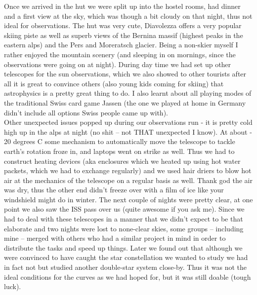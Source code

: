  Once we arrived in the hut we were split up into the hostel rooms, had dinner and a first view at the sky, which was though a bit cloudy on that night, thus not ideal for observations. The hut was very cute, Diavolezza offers a very popular skiing piste as well as superb views of the Bernina massif (highest peaks in the eastern alps) and the Pers and Moreratsch glacier. Being a non-skier myself I rather enjoyed the mountain scenery (and sleeping in on mornings, since the observations were going on at night). During day time we had set up other telescopes for the sun observations, which we also showed to other tourists after all it is great to convince others (also young kids coming for skiing) that astrophysics is a pretty great thing to do. I also learnt about all playing modes of the traditional Swiss card game Jassen (the one we played at home in Germany didn't include all options Swiss people came up with).\\
 Other unexpected issues popped up during our observations run - it is pretty cold high up in the alps at night (no shit -- not THAT unexpected I know). At about - 20 degrees C some mechanism to automatically move the telescope to tackle earth's rotation froze in, and laptops went on strike as well. Thus we had to construct heating devices (aka enclosures which we heated up using hot water packets, which we had to exchange regularly) and we used hair driers to blow hot air at the mechanics of the telescope on a regular basis as well. Thank god the air was dry, thus the other end didn't freeze over with a film of ice like your windshield might do in winter. The next couple of nights were pretty clear, at one point we also saw the ISS pass over us (quite awesome if you ask me). Since we had to deal with these telescopes in a manner that we didn't expect to be that elaborate and two nights were lost to none-clear skies, some groups -- including mine -- merged with others who had a similar project in mind in order to distribute the tasks and speed up things. 
 Later we found out that although we were convinced to have caught the star constellation we wanted to study we had in fact not but studied another double-star system close-by. Thus it was not the ideal conditions for the curves as we had hoped for, but it was still doable (tough luck).\\
